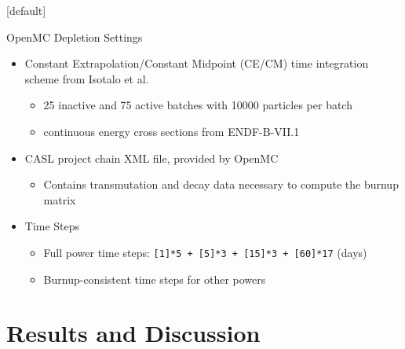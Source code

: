 \documentclass[9pt,t,aspectratio=169]{beamer}
\makeatletter
\newenvironment{withoutheadline}{
       \setbeamertemplate{headline}[default]
       \def\beamer@entrycode{\vspace*{-\headheight}}
    }{}
\makeatother
\begin{document}
\begin{withoutheadline}
\begin{frame}{OpenMC Depletion Settings}
    \pause
    \LARGE
    \begin{itemize}
        \item<2-> Constant Extrapolation/Constant Midpoint (CE/CM) time integration scheme from Isotalo et al. \cite{isotalo_comparison_2015}
        \begin{itemize}
            \Large
            \item<2-> 25 inactive and 75 active batches with 10000 particles per batch
            \item<2-> continuous energy cross sections from ENDF-B-VII.1
        \end{itemize}
        \item<3-> CASL project \cite{CASL-report} chain XML file, provided by OpenMC \cite{openmc-chains}
        \begin{itemize}
            \Large
            \item<3-> Contains transmutation and decay data necessary to compute the burnup matrix
        \end{itemize}
        \item<4-> Time Steps
        \begin{itemize}
            \Large
            \item<4-> Full power time steps: \texttt{[1]*5 + [5]*3 + [15]*3 + [60]*17} (days)
            \item<4-> Burnup-consistent time steps for other powers
        \end{itemize}
    \end{itemize}
    \normalsize
\end{frame}
\end{withoutheadline}
\section{Results and Discussion}
\end{document}
